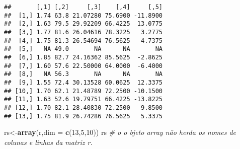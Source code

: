 \documentclass[]{article}
\newenvironment{Shaded}{\begin{snugshade}}{\end{snugshade}}
\newcommand{\KeywordTok}[1]{\textcolor[rgb]{0.13,0.29,0.53}{\textbf{#1}}}
\newcommand{\DataTypeTok}[1]{\textcolor[rgb]{0.13,0.29,0.53}{#1}}
\newcommand{\DecValTok}[1]{\textcolor[rgb]{0.00,0.00,0.81}{#1}}
\newcommand{\CommentTok}[1]{\textcolor[rgb]{0.56,0.35,0.01}{\textit{#1}}}
\newcommand{\NormalTok}[1]{#1}
\begin{document}
\begin{verbatim}
##       [,1] [,2]     [,3]    [,4]     [,5]
##  [1,] 1.74 63.8 21.07280 75.6900 -11.8900
##  [2,] 1.63 79.5 29.92209 66.4225  13.0775
##  [3,] 1.77 81.6 26.04616 78.3225   3.2775
##  [4,] 1.75 81.3 26.54694 76.5625   4.7375
##  [5,]   NA 49.0       NA      NA       NA
##  [6,] 1.85 82.7 24.16362 85.5625  -2.8625
##  [7,] 1.60 57.6 22.50000 64.0000  -6.4000
##  [8,]   NA 56.3       NA      NA       NA
##  [9,] 1.55 72.4 30.13528 60.0625  12.3375
## [10,] 1.70 62.1 21.48789 72.2500 -10.1500
## [11,] 1.63 52.6 19.79751 66.4225 -13.8225
## [12,] 1.70 82.1 28.40830 72.2500   9.8500
## [13,] 1.75 81.9 26.74286 76.5625   5.3375
\end{verbatim}

\begin{Shaded}
\begin{Highlighting}[]
\NormalTok{rs<-}\KeywordTok{array}\NormalTok{(r,}\DataTypeTok{dim =} \KeywordTok{c}\NormalTok{(}\DecValTok{13}\NormalTok{,}\DecValTok{5}\NormalTok{,}\DecValTok{10}\NormalTok{))}
\NormalTok{rs }\CommentTok{# o o bjeto array não herda os nomes de colunas e linhas da matriz r.}
\end{Highlighting}
\end{Shaded}
\end{document}
